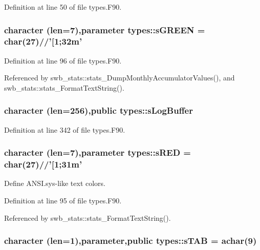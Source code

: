 Definition at line 50 of file types.F90.

\hypertarget{namespacetypes_a07437ed48493a8bc7c3f5f73bd3b09ea}{
\subsubsection[{sGREEN}]{\setlength{\rightskip}{0pt plus 5cm}character (len=7),parameter {\bf types::sGREEN} = char(27)//'\mbox{[}1;32m'}}
\label{namespacetypes_a07437ed48493a8bc7c3f5f73bd3b09ea}


Definition at line 96 of file types.F90.



Referenced by swb\_\-stats::stats\_\-DumpMonthlyAccumulatorValues(), and swb\_\-stats::stats\_\-FormatTextString().

\hypertarget{namespacetypes_a67706eade7740303d70d3377080a9eb3}{
\subsubsection[{sLogBuffer}]{\setlength{\rightskip}{0pt plus 5cm}character (len=256),public {\bf types::sLogBuffer}}}
\label{namespacetypes_a67706eade7740303d70d3377080a9eb3}


Definition at line 342 of file types.F90.

\hypertarget{namespacetypes_abb0ecc9c9b6f0e08002fec018d71001c}{
\subsubsection[{sRED}]{\setlength{\rightskip}{0pt plus 5cm}character (len=7),parameter {\bf types::sRED} = char(27)//'\mbox{[}1;31m'}}
\label{namespacetypes_abb0ecc9c9b6f0e08002fec018d71001c}


Define ANSI.sys-\/like text colors. 



Definition at line 95 of file types.F90.



Referenced by swb\_\-stats::stats\_\-FormatTextString().

\hypertarget{namespacetypes_a1aba85f347398a7d96a17c88c664c7a1}{
\subsubsection[{sTAB}]{\setlength{\rightskip}{0pt plus 5cm}character (len=1),parameter,public {\bf types::sTAB} = achar(9)}}
\label{namespacetypes_a1aba85f347398a7d96a17c88c664c7a1}


